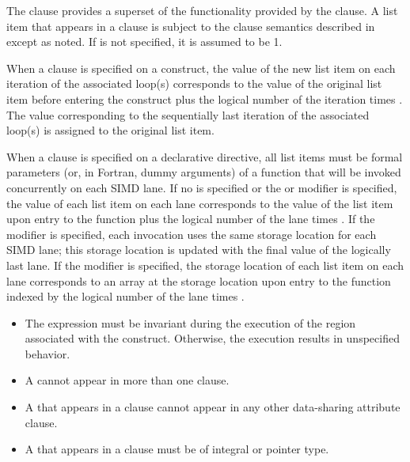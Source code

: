 {{{{\descr
The  clause provides a superset of the functionality provided by the  clause.
A list item that appears in a  clause is subject to the  clause semantics described
in  except as noted.
If  is not specified, it is assumed to be 1.

When a  clause is specified on a construct, the value of the new list item on each iteration of the associated loop(s) corresponds to the value of the original list item before entering the construct plus the logical number of the iteration times . 
The value corresponding to the sequentially last iteration of the associated loop(s) is assigned to the original list item.

When a  clause is specified on a declarative directive, all list items must be formal parameters (or, in Fortran, dummy arguments) of a function that will be invoked concurrently on each SIMD lane.
If no  is specified or the  or  modifier is specified, the value of each list item on each lane corresponds to the value of the list item upon entry to the function plus the logical number of the lane times .
If the  modifier is specified, each invocation uses the same storage location for each SIMD lane; this storage location is updated with the final value of the logically last lane.
If the  modifier is specified, the storage location of each list item on each lane corresponds to an array at the storage location upon entry to the function indexed by the logical number of the lane times .


\restrictions
\begin{itemize}
\item The  expression must be invariant during the execution of the region 
associated with the construct. Otherwise, the execution results in unspecified 
behavior.

\item A  cannot appear in more than one  clause.

\item A  that appears in a  clause cannot appear in any other data-sharing 
attribute clause. 

\cspecificstart
\item A  that appears in a  clause must be of integral or pointer type.
\cspecificend


\end{itemize}}}}}
